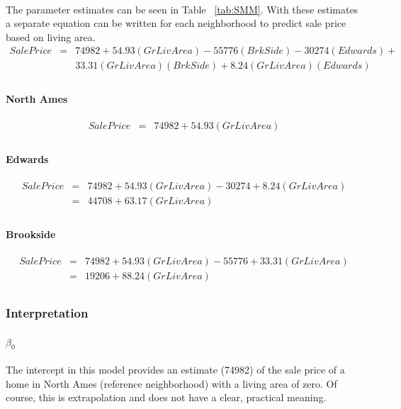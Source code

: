 \documentclass[11pt]{scrartcl} %
\begin{document}
\paragraph{} The parameter estimates can be seen in Table ~\ref{tab:SMM}. With these estimates a separate equation can be written for each neighborhood to predict sale price based on living area.
\begin{eqnarray*}
SalePrice &=& 74982 + 54.93(GrLivArea) - 55776(BrkSide) - 30274(Edwards) + \\
& & 33.31(GrLivArea)(BrkSide) + 8.24(GrLivArea)(Edwards)\\
\end{eqnarray*}
\paragraph{North Ames}
\begin{eqnarray*}
SalePrice &=& 74982 + 54.93(GrLivArea)\\
\end{eqnarray*}
\paragraph{Edwards}
\begin{eqnarray*}
SalePrice &=& 74982 + 54.93(GrLivArea) - 30274 + 8.24(GrLivArea)\\
&=& 44708 + 63.17(GrLivArea)\\
\end{eqnarray*}
\paragraph{Brookside}
\begin{eqnarray*}
SalePrice &=& 74982 + 54.93(GrLivArea) - 55776 + 33.31(GrLivArea)\\
&=& 19206 + 88.24(GrLivArea)\\
\end{eqnarray*}
\subsubsection{Interpretation}
\paragraph{$\beta_0$}The intercept in this model provides an estimate (74982) of the sale price of a home in North Ames (reference neighborhood) with a living area of zero. Of course, this is extrapolation and does not have a clear, practical meaning.
\end{document}
